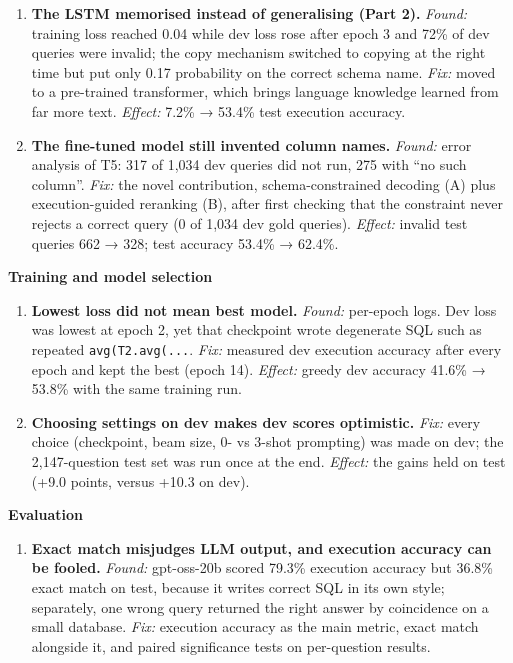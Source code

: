 \documentclass[
  10pt,
]{article}
\providecommand{\tightlist}{%
  \setlength{\itemsep}{0pt}\setlength{\parskip}{0pt}}
\begin{document}
\begin{enumerate}
\def\labelenumi{\arabic{enumi}.}
\setcounter{enumi}{4}
\tightlist
\item
  \textbf{The LSTM memorised instead of generalising (Part 2).}
  \emph{Found:} training loss reached 0.04 while dev loss rose after
  epoch 3 and 72\% of dev queries were invalid; the copy mechanism
  switched to copying at the right time but put only 0.17 probability on
  the correct schema name. \emph{Fix:} moved to a pre-trained
  transformer, which brings language knowledge learned from far more
  text. \emph{Effect:} 7.2\% → 53.4\% test execution accuracy.
\item
  \textbf{The fine-tuned model still invented column names.}
  \emph{Found:} error analysis of T5: 317 of 1,034 dev queries did not
  run, 275 with ``no such column''. \emph{Fix:} the novel contribution,
  schema-constrained decoding (A) plus execution-guided reranking (B),
  after first checking that the constraint never rejects a correct query
  (0 of 1,034 dev gold queries). \emph{Effect:} invalid test queries 662
  → 328; test accuracy 53.4\% → 62.4\%.
\end{enumerate}

\textbf{Training and model selection}

\begin{enumerate}
\def\labelenumi{\arabic{enumi}.}
\setcounter{enumi}{6}
\tightlist
\item
  \textbf{Lowest loss did not mean best model.} \emph{Found:} per-epoch
  logs. Dev loss was lowest at epoch 2, yet that checkpoint wrote
  degenerate SQL such as repeated \texttt{avg(T2.avg(...}. \emph{Fix:}
  measured dev execution accuracy after every epoch and kept the best
  (epoch 14). \emph{Effect:} greedy dev accuracy 41.6\% → 53.8\% with
  the same training run.
\item
  \textbf{Choosing settings on dev makes dev scores optimistic.}
  \emph{Fix:} every choice (checkpoint, beam size, 0- vs 3-shot
  prompting) was made on dev; the 2,147-question test set was run once
  at the end. \emph{Effect:} the gains held on test (+9.0 points, versus
  +10.3 on dev).
\end{enumerate}

\textbf{Evaluation}

\begin{enumerate}
\def\labelenumi{\arabic{enumi}.}
\setcounter{enumi}{8}
\tightlist
\item
  \textbf{Exact match misjudges LLM output, and execution accuracy can
  be fooled.} \emph{Found:} gpt-oss-20b scored 79.3\% execution accuracy
  but 36.8\% exact match on test, because it writes correct SQL in its
  own style; separately, one wrong query returned the right answer by
  coincidence on a small database. \emph{Fix:} execution accuracy as the
  main metric, exact match alongside it, and paired significance tests
  on per-question results.
\end{enumerate}
\end{document}
